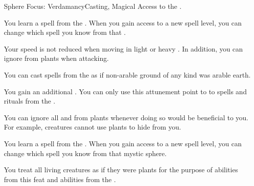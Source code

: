     \begin{feat}{Sphere Focus: Verdamancy}{Casting, Magical}
        \featpre Access to the  .

         You learn a spell from the  .
        When you gain access to a new spell level, you can change which spell you know from that .

         Your speed is not reduced when moving in light or heavy .
        In addition, you can ignore  from plants when attacking.

         You can cast spells from the   as if non-arable ground of any kind was arable earth.

         You gain an additional .
        You can only use this attunement point to  to spells and rituals from the  .

         You can ignore all  and  from plants whenever doing so would be beneficial to you.
        For example, creatures cannot use plants to hide from you.

         You learn a spell from the  .
        When you gain access to a new spell level, you can change which spell you know from that mystic sphere.

         You treat all living creatures as if they were plants for the purpose of abilities from this feat and abilities from the  .
    \end{feat}

